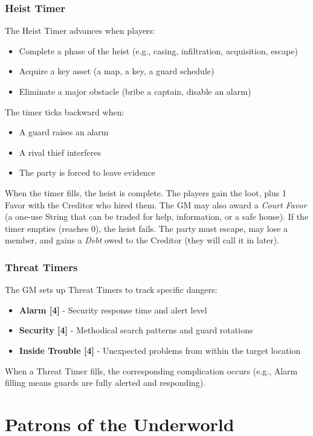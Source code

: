 \documentclass[10pt,twoside]{book}
\begin{document}
\section{Heist Timer }
The Heist Timer advances when players:
\begin{itemize}
\item Complete a phase of the heist (e.g., casing, infiltration, acquisition, escape)
\item Acquire a key asset (a map, a key, a guard schedule)
\item Eliminate a major obstacle (bribe a captain, disable an alarm)
\end{itemize}
The timer ticks backward when:
\begin{itemize}
\item A guard raises an alarm
\item A rival thief interferes
\item The party is forced to leave evidence
\end{itemize}
When the timer fills, the heist is complete. The players gain the loot, plus 1 Favor with the Creditor who hired them. The GM may also award a \textit{Court Favor} (a one-use String that can be traded for help, information, or a safe house).
If the timer empties (reaches 0), the heist fails. The party must escape, may lose a member, and gains a \textit{Debt} owed to the Creditor (they will call it in later).

\section{Threat Timers}
The GM sets up Threat Timers to track specific dangers:
\begin{itemize}
\item \textbf{Alarm [4]} - Security response time and alert level
\item \textbf{Security [4]} - Methodical search patterns and guard rotations
\item \textbf{Inside Trouble [4]} - Unexpected problems from within the target location
\end{itemize}
When a Threat Timer fills, the corresponding complication occurs (e.g., Alarm filling means guards are fully alerted and responding).


\part{Patrons of the Underworld}
\end{document}
